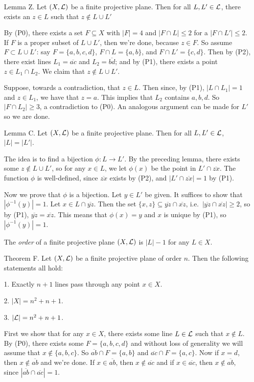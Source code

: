 \proclaim Lemma Z. Let $(X,{\cal L})$ be a finite projective plane. Then for all $L, L'\in {\cal L}$, there exists an $z\in L$ such that $z\notin L\cup L'$

\proof By (P0), there exists a set $F\subseteq X$ with $|F| = 4$ and $|F\cap L|\leq 2$ for a $|F\cap L'|\leq 2$. If $F$ is a proper subset of $L\cup L'$, then we're done, because $z\in F$. So assume $F\subset L\cup L'$: say $F = \{a, b,c,d\}$, $F\cap L = \{a, b\}$, and $F\cap L' = \{c, d\}$. Then by (P2), there exist lines $L_1 = \overline{ac}$ and $L_2 = \overline{bd}$; and by (P1), there exists a point $z\in L_1\cap L_2$. We claim that $z\notin L\cup L'$.

Suppose, towards a contradiction, that $z\in L$. Then since, by (P1), $|L\cap L_1| = 1$ and $z\in L_1$, we have that $z = a$. This implies that $L_2$ contains $a,b,d$. So $|F\cap L_2| \geq 3$, a contradiction to (P0). An analogous argument can be made for $L'$ so we are done. \slug

\proclaim Lemma C. Let $(X,{\cal L})$ be a finite projective plane. Then for all $L,L'\in {\cal L}$, $|L| = |L'|$.

\proof The idea is to find a bijection $\phi : L \rightarrow L'$. By the preceding lemma, there exists some $z\notin L\cup L'$, so for any $x\in L$, we let $\phi(x)$ be the point in $L'\cap \overline{zx}$. The function $\phi$ is well-defined, since $\overline{zx}$ exists by (P2), and $|L' \cap \overline{zx}| = 1$ by (P1).

Now we prove that $\phi$ is a bijection. Let $y\in L'$ be given. It suffices to show that $|\phi^{-1}(y)| = 1$. Let $x\in L\cap \overline{yz}$. Then the set $\{x,z\}\subseteq \overline{yz}\cap\overline{xz}$, i.e.\  $|\overline{yz}\cap\overline{xz}|\geq 2$, so by (P1), $\overline{yz} = \overline{xz}$. This means that $\phi(x) = y$ and $x$ is unique by (P1), so $|\phi^{-1}(y)| = 1$.\slug

The {\it order} of a finite projective plane $(X, {\cal L})$ is $|L| - 1$ for any $L\in X$.

\proclaim Theorem F. Let $(X,{\cal L})$ be a finite projective plane of order $n$. Then the following statements all hold:
\medskip
\item {1.} Exactly $n+1$ lines pass through any point $x\in X$.
\smallskip
\item {2.} $|X| = n^2 + n + 1$.
\smallskip
\item {3.} $|{\cal L}| = n^2 + n + 1$.
\medskip

\proof First we show that for any $x\in X$, there exists some line $L\in {\cal L}$ such that $x\notin L$. By (P0), there exists some $F = \{a,b,c,d\}$ and without loss of generality we will assume that $x\notin\{a,b,c\}$. So $\overline{ab} \cap F = \{a,b\}$ and $\overline{ac}\cap F = \{a, c\}$. Now if $x = d$, then $x\notin \overline{ab}$ and we're done. If $x\in \overline{ab}$, then $x\notin\overline{ac}$ and if $x\in \overline{ac}$, then $x\notin\overline{ab}$, since $|\overline{ab} \cap\overline{ac}| = 1$.

